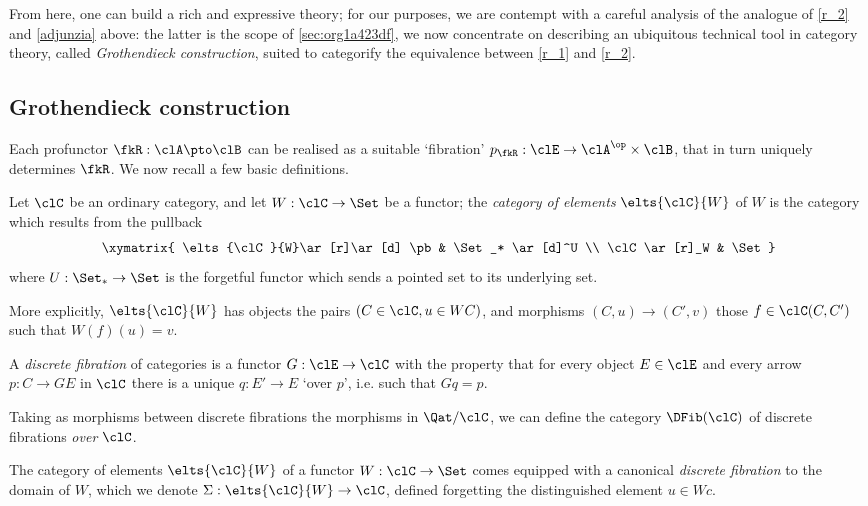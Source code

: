 From here, one can build a rich and expressive theory; for our purposes, we are contempt with a careful analysis of the analogue of \ref{r_2} and \eqref{adjunzia} above: the latter is the scope of \autoref{sec:org1a423df}, we now concentrate on describing an ubiquitous technical tool in category theory, called \emph{Gro\-then\-dieck construction}, suited to categorify the equivalence between \ref{r_1} and \ref{r_2}.

\subsection{Gro\-then\-dieck construction}

Each profunctor $\fkR : \clA \pto \clB$ can be realised as a suitable `fibration' $p_\fkR : \clE \to \clA^\op\times\clB$, that in turn uniquely determines $\fkR$.
We now recall a few basic definitions.
\begin{definition}\label{eltsf}
	Let $\clC$ be an ordinary category, and let $W : \clC\to \Set$ be a functor; the \emph{category of elements} $\elts{\clC}{W}$ of $W$ is the category which results from the pullback
	\[
		\xymatrix{
			\elts{\clC}{W}\ar[r]\ar[d] \pb & \Set_* \ar[d]^U \\
			\clC \ar[r]_W & \Set
		}
	\]
	where $U : \Set_*\to\Set$ is the forgetful functor which sends a pointed set to its underlying set.

	More explicitly, $\elts{\clC}{W}$ has objects the pairs $(C\in\clC, u\in WC)$, and morphisms $(C,u)\to (C',v)$ those $f\in \clC(C,C')$ such that $W(f)(u)=v$.
\end{definition}
\begin{definition}
	\label{def:dfib}
	A \emph{discrete fibration} of categories is a functor $G : \clE \to \clC$ with the property that for every object $E\in\clE$ and every arrow $p : C\to GE$ in $\clC$ there is a unique $q : E'\to E$ `over $p$', i.e. such that $Gq=p$.
\end{definition}
Taking as morphisms between discrete fibrations the morphisms in $\Qat/\clC$, we can define the category $\DFib(\clC)$ of discrete fibrations \emph{over} $\clC$.
\begin{proposition}\label{fibelem}
	The category of elements $\elts{\clC}{W}$ of a functor $W : \clC\to \Set$ comes equipped with a canonical \emph{discrete fibration} to the domain of $W$, which we denote $\Sigma : \elts{\clC}{W}\to \clC$, defined forgetting the distinguished element $u\in Wc$.
\end{proposition}
